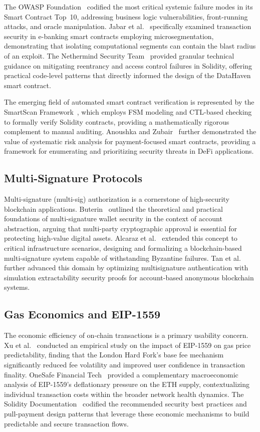 \documentclass[conference]{IEEEtran}
\begin{document}
The OWASP Foundation~\cite{ref11} codified the most critical systemic failure
modes in its Smart Contract Top~10, addressing business logic vulnerabilities,
front-running attacks, and oracle manipulation. Jabar et al.~\cite{ref7}
specifically examined transaction security in e-banking smart contracts
employing microsegmentation, demonstrating that isolating computational
segments can contain the blast radius of an exploit. The Nethermind Security
Team~\cite{ref9} provided granular technical guidance on mitigating reentrancy
and access control failures in Solidity, offering practical code-level patterns
that directly informed the design of the DataHaven smart contract.

The emerging field of automated smart contract verification is represented by
the SmartScan Framework~\cite{ref12}, which employs FSM modeling and CTL-based
checking to formally verify Solidity contracts, providing a mathematically
rigorous complement to manual auditing. Anoushka and Zubair~\cite{ref3} further
demonstrated the value of systematic risk analysis for payment-focused smart
contracts, providing a framework for enumerating and prioritizing security
threats in DeFi applications.

\subsection{Multi-Signature Protocols}

Multi-signature (multi-sig) authorization is a cornerstone of high-security
blockchain applications. Buterin~\cite{ref4} outlined the theoretical and
practical foundations of multi-signature wallet security in the context of
account abstraction, arguing that multi-party cryptographic approval is
essential for protecting high-value digital assets. Alcaraz et
al.~\cite{ref2,ref18} extended this concept to critical infrastructure
scenarios, designing and formalizing a blockchain-based multi-signature system
capable of withstanding Byzantine failures. Tan et al.~\cite{ref17} further
advanced this domain by optimizing multisignature authentication with
simulation extractability security proofs for account-based anonymous
blockchain systems.

\subsection{Gas Economics and EIP-1559}

The economic efficiency of on-chain transactions is a primary usability
concern. Xu et al.~\cite{ref14} conducted an empirical study on the impact of
EIP-1559 on gas price predictability, finding that the London Hard Fork's base
fee mechanism significantly reduced fee volatility and improved user
confidence in transaction finality. OneSafe Financial Tech~\cite{ref10}
provided a complementary macroeconomic analysis of EIP-1559's deflationary
pressure on the ETH supply, contextualizing individual transaction costs within
the broader network health dynamics. The Solidity Documentation~\cite{ref13}
codified the recommended security best practices and pull-payment design
patterns that leverage these economic mechanisms to build predictable and secure
transaction flows.
\end{document}
